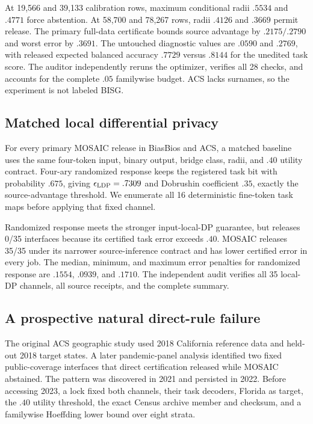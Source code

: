 At 19,566 and 39,133 calibration rows, maximum conditional radii $.5534$ and
$.4771$ force abstention. At 58,700 and 78,267 rows, radii $.4126$ and $.3669$
permit release. The primary full-data certificate bounds source advantage by
$.2175/.2790$ and worst error by $.3691$. The untouched diagnostic values are
$.0590$ and $.2769$, with released expected balanced accuracy $.7729$ versus
$.8144$ for the unedited task score. The auditor independently reruns the
optimizer, verifies all 28 checks, and accounts for the complete $.05$
familywise budget. ACS lacks surnames, so the experiment is not labeled BISG.

\subsection{Matched local differential privacy}

For every primary MOSAIC release in BiasBios and ACS, a matched baseline uses
the same four-token input, binary output, bridge class, radii, and $.40$
utility contract. Four-ary randomized response keeps the registered task bit
with probability $.675$, giving $\epsilon_{\rm LDP}=.7309$ and Dobrushin
coefficient $.35$, exactly the source-advantage threshold. We enumerate all
16 deterministic fine-token task maps before applying that fixed channel.

Randomized response meets the stronger input-local-DP guarantee, but releases
0/35 interfaces because its certified task error exceeds $.40$. MOSAIC
releases 35/35 under its narrower source-inference contract and has lower
certified error in every job. The median, minimum, and maximum error penalties
for randomized response are $.1554$, $.0939$, and $.1710$. The independent
audit verifies all 35 local-DP channels, all source receipts, and the complete
summary.

\subsection{A prospective natural direct-rule failure}

The original ACS geographic study used 2018 California reference data and
held-out 2018 target states. A later pandemic-panel analysis identified two
fixed public-coverage interfaces that direct certification released while
MOSAIC abstained. The pattern was discovered in 2021 and persisted in 2022.
Before accessing 2023, a lock fixed both channels, their task decoders, Florida
as target, the $.40$ utility threshold, the exact Census archive member and
checksum, and a familywise Hoeffding lower bound over eight strata.

